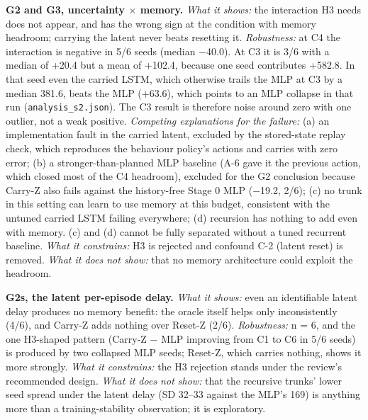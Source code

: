 \documentclass[11pt]{article}
\begin{document}
\textbf{G2 and G3, uncertainty $\times$ memory.} \emph{What it shows:} the interaction H3 needs does not appear, and has the wrong sign at the condition with memory headroom; carrying the latent never beats resetting it. \emph{Robustness:} at C4 the interaction is negative in 5/6 seeds (median $-$40.0). At C3 it is 3/6 with a median of +20.4 but a mean of +102.4, because one seed contributes +582.8. In that seed even the carried LSTM, which otherwise trails the MLP at C3 by a median 381.6, beats the MLP (+63.6), which points to an MLP collapse in that run (\texttt{analysis\_\allowbreak{}s2.\allowbreak{}json}). The C3 result is therefore noise around zero with one outlier, not a weak positive. \emph{Competing explanations for the failure:} (a) an implementation fault in the carried latent, excluded by the stored-state replay check, which reproduces the behaviour policy's actions and carries with zero error; (b) a stronger-than-planned MLP baseline (A-6 gave it the previous action, which closed most of the C4 headroom), excluded for the G2 conclusion because Carry-Z also fails against the history-free Stage 0 MLP ($-$19.2, 2/6); (c) no trunk in this setting can learn to use memory at this budget, consistent with the untuned carried LSTM failing everywhere; (d) recursion has nothing to add even with memory. (c) and (d) cannot be fully separated without a tuned recurrent baseline. \emph{What it constrains:} H3 is rejected and confound C-2 (latent reset) is removed. \emph{What it does not show:} that no memory architecture could exploit the headroom.



\textbf{G2s, the latent per-episode delay.} \emph{What it shows:} even an identifiable latent delay produces no memory benefit: the oracle itself helps only inconsistently (4/6), and Carry-Z adds nothing over Reset-Z (2/6). \emph{Robustness:} n = 6, and the one H3-shaped pattern (Carry-Z $-$ MLP improving from C1 to C6 in 5/6 seeds) is produced by two collapsed MLP seeds; Reset-Z, which carries nothing, shows it more strongly. \emph{What it constrains:} the H3 rejection stands under the review's recommended design. \emph{What it does not show:} that the recursive trunks' lower seed spread under the latent delay (SD 32--33 against the MLP's 169) is anything more than a training-stability observation; it is exploratory.
\end{document}
